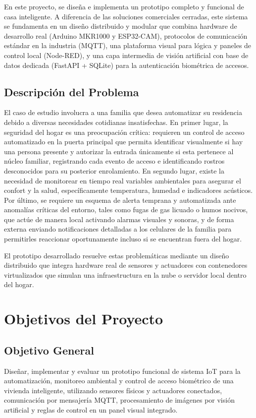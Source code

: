 \documentclass[12pt,letterpaper]{article}
\begin{document}
En este proyecto, se diseña e implementa un prototipo completo y funcional de casa inteligente. A diferencia de las soluciones comerciales cerradas, este sistema se fundamenta en un diseño distribuido y modular que combina hardware de desarrollo real (Arduino MKR1000 y ESP32-CAM), protocolos de comunicación estándar en la industria (MQTT), una plataforma visual para lógica y paneles de control local (Node-RED), y una capa intermedia de visión artificial con base de datos dedicada (FastAPI + SQLite) para la autenticación biométrica de accesos.

\subsection{Descripción del Problema}
El caso de estudio involucra a una familia que desea automatizar su residencia debido a diversas necesidades cotidianas insatisfechas. En primer lugar, la seguridad del hogar es una preocupación crítica: requieren un control de acceso automatizado en la puerta principal que permita identificar visualmente si hay una persona presente y autorizar la entrada únicamente si esta pertenece al núcleo familiar, registrando cada evento de acceso e identificando rostros desconocidos para su posterior enrolamiento. En segundo lugar, existe la necesidad de monitorear en tiempo real variables ambientales para asegurar el confort y la salud, específicamente temperatura, humedad e indicadores acústicos. Por último, se requiere un esquema de alerta temprana y automatizada ante anomalías críticas del entorno, tales como fugas de gas licuado o humos nocivos, que actúe de manera local activando alarmas visuales y sonoras, y de forma externa enviando notificaciones detalladas a los celulares de la familia para permitirles reaccionar oportunamente incluso si se encuentran fuera del hogar.

El prototipo desarrollado resuelve estas problemáticas mediante un diseño distribuido que integra hardware real de sensores y actuadores con contenedores virtualizados que simulan una infraestructura en la nube o servidor local dentro del hogar.

\newpage
\section{Objetivos del Proyecto}

\subsection{Objetivo General}
Diseñar, implementar y evaluar un prototipo funcional de sistema IoT para la automatización, monitoreo ambiental y control de acceso biométrico de una vivienda inteligente, utilizando sensores físicos y actuadores conectados, comunicación por mensajería MQTT, procesamiento de imágenes por visión artificial y reglas de control en un panel visual integrado.
\end{document}
